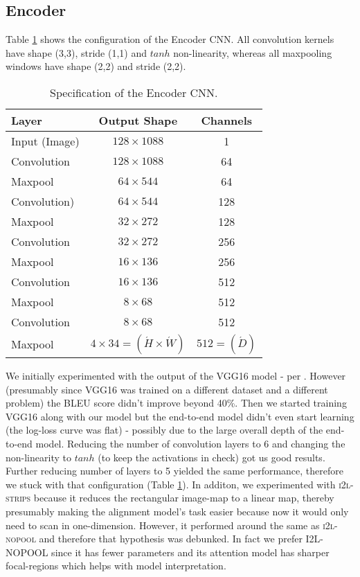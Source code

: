 \subsection{Encoder}
\label{encoder-commentary}
Table \ref{table-cnn} shows the configuration of the Encoder CNN. All convolution kernels have shape (3,3), stride (1,1) and $tanh$ non-linearity, whereas all maxpooling windows have shape (2,2) and stride (2,2).
\begin{table}[!hbtp]
	\caption{Specification of the Encoder CNN.}
	\begin{tabular}{lcc}
		\hline
		{Layer} & Output Shape & {Channels} \\
		\hline
		Input (Image) & $128 \times 1088$ & 1\\
		Convolution & $128 \times 1088$ & 64 \\
		Maxpool & $64 \times 544$ & 64 \\
		Convolution) & $64 \times 544$ & 128 \\
		Maxpool & $32 \times 272$ & 128 \\
		Convolution & $32 \times 272$ & 256 \\
		Maxpool & $16 \times 136$ & 256 \\
		Convolution & $16 \times 136$ & 512 \\
		Maxpool & $8 \times 68$ & 512 \\
		Convolution & $8 \times 68$ & 512 \\
		Maxpool & $4 \times 34 = (\acute{H} \times \acute{W})$ & $512 = (\acute{D})$ 
	\end{tabular}
	\centering
	\label{table-cnn}
\end{table}
We initially experimented with the output of the VGG16 model \cite{Simonyan2014VeryDC} - per \citet{Xu2015ShowAA}. However (presumably since VGG16 was trained on a different dataset and a different problem) the BLEU score didn't improve beyond 40\%. Then we started training VGG16 along with our model but the end-to-end model didn't even start learning (the log-loss curve was flat) - possibly due to the large overall depth of the end-to-end model. Reducing the number of convolution layers to 6 and changing the non-linearity to $tanh$ (to keep the activations in check) got us good results. Further reducing number of layers to 5 yielded the same performance, therefore we stuck with that configuration (Table \ref{table-cnn}). In additon, we experimented with \textsc{i2l-strips} because it reduces the rectangular image-map to a linear map, thereby presumably making the alignment model's task easier because now it would only need to scan in one-dimension. However, it performed around the same as \textsc{i2l-nopool} and therefore that hypothesis was debunked. In fact we prefer I2L-NOPOOL since it has fewer parameters and its attention model has sharper focal-regions which helps with model interpretation.

